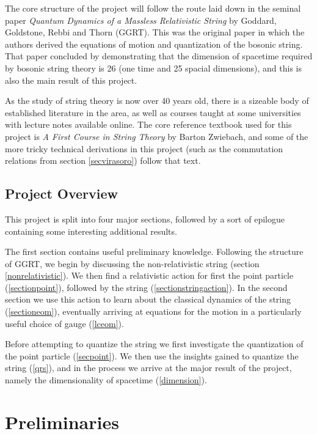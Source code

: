\documentclass[a4paper,12pt]{article}
\numberwithin{equation}{section}
\begin{document}
The core structure of the project will follow the route laid down in the seminal paper \emph{Quantum Dynamics of a Massless Relativistic String} by Goddard, Goldstone, Rebbi and Thorn (GGRT)\cite{ggrt}. This was the original paper in which the authors derived the equations of motion and quantization of the bosonic string. That paper concluded by demonstrating that the dimension of spacetime required by bosonic string theory is 26 (one time and 25 spacial dimensions), and this is also the main result of this project.

As the study of string theory is now over 40 years old, there is a sizeable body of established literature in the area\cite{polchinski}\cite{gsw}, as well as courses taught at some universities with lecture notes available online\cite{tong}\cite{thooft}. The core reference textbook used for this project is \emph{A First Course in String Theory} by Barton Zwiebach\cite{zwiebach}, and some of the more tricky technical derivations in this project (such as the commutation relations from section \ref{secvirasoro}) follow that text.
\subsection{Project Overview} 
This project is split into four major sections, followed by a sort of epilogue containing some interesting additional results.

The first section contains useful preliminary knowledge. Following the structure of GGRT, we begin by discussing the non-relativistic string (section \ref{nonrelativistic}). We then find a relativistic action for first the point particle (\ref{sectionpoint}), followed by the string (\ref{sectionstringaction}). In the second section we use this action to learn about the classical dynamics of the string (\ref{sectioneom}), eventually arriving at equations for the motion in a particularly useful choice of gauge (\ref{lceom}).

Before attempting to quantize the string we first investigate the quantization of the point particle (\ref{secpoint}). We then use the insights gained to quantize the string (\ref{qrs}), and in the process we arrive at the major result of the project, namely the dimensionality of spacetime (\ref{dimension}).
\section{Preliminaries}\label{prelim}
\end{document}
